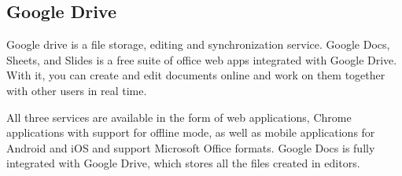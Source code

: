 \subsection{Google Drive}
Google drive is a file storage, editing and synchronization service. Google Docs, Sheets, and Slides is a free suite of office web apps integrated with Google Drive. With it, you can create and edit documents online and work on them together with other users in real time. 

All three services are available in the form of web applications, Chrome applications with support for offline mode, as well as mobile applications for Android and iOS and support Microsoft Office formats. Google Docs is fully integrated with Google Drive, which stores all the files created in editors.\cite{GoogleDriveContents}